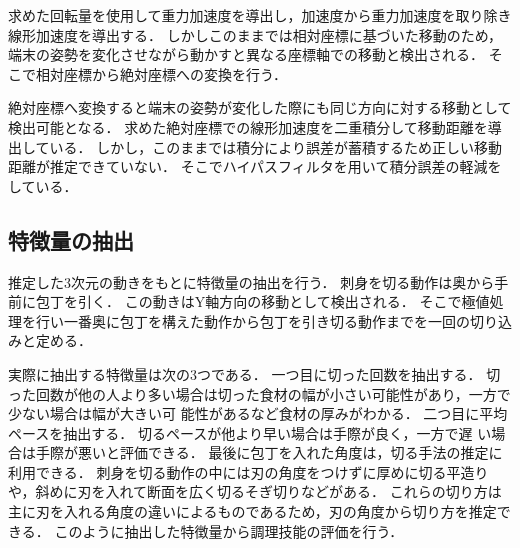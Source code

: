 求めた回転量を使用して重力加速度を導出し，加速度から重力加速度を取り除き線形加速度を導出する．
しかしこのままでは相対座標に基づいた移動のため，端末の姿勢を変化させながら動かすと異なる座標軸での移動と検出される．
そこで相対座標から絶対座標への変換を行う．
	
絶対座標へ変換すると端末の姿勢が変化した際にも同じ方向に対する移動として検出可能となる．
求めた絶対座標での線形加速度を二重積分して移動距離を導出している．
しかし，このままでは積分により誤差が蓄積するため正しい移動距離が推定できていない．
そこでハイパスフィルタを用いて積分誤差の軽減をしている．

\subsection{特徴量の抽出}
推定した3次元の動きをもとに特徴量の抽出を行う．
刺身を切る動作は奥から手前に包丁を引く．
この動きはY軸方向の移動として検出される．
そこで極値処理を行い一番奥に包丁を構えた動作から包丁を引き切る動作までを一回の切り込みと定める．

実際に抽出する特徴量は次の3つである．
一つ目に切った回数を抽出する．
切った回数が他の人より多い場合は切った食材の幅が小さい可能性があり，一方で少ない場合は幅が大きい可
能性があるなど食材の厚みがわかる．
二つ目に平均ペースを抽出する．
切るペースが他より早い場合は手際が良く，一方で遅
い場合は手際が悪いと評価できる．
最後に包丁を入れた角度は，切る手法の推定に利用できる．
刺身を切る動作の中には刃の角度をつけずに厚めに切る平造りや，斜めに刃を入れて断面を広く切るそぎ切りなどがある．
これらの切り方は主に刃を入れる角度の違いによるものであるため，刃の角度から切り方を推定できる．
このように抽出した特徴量から調理技能の評価を行う．
